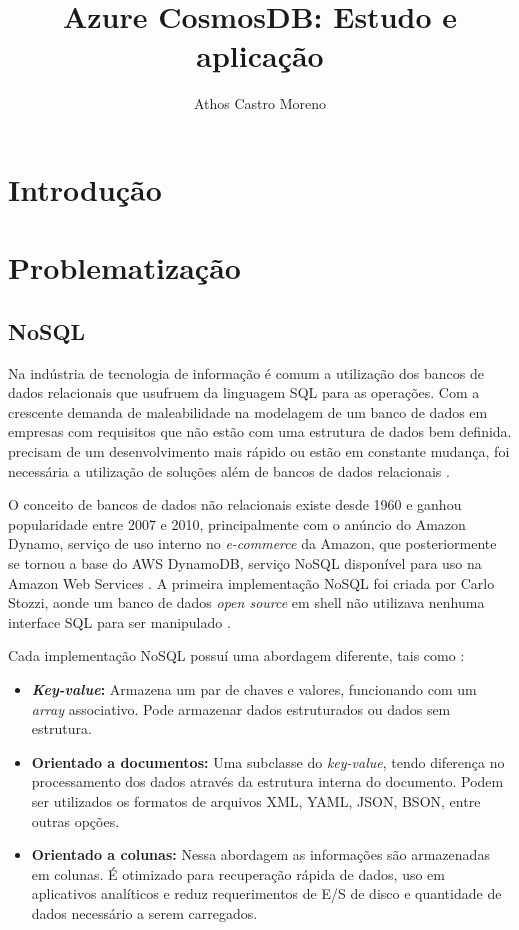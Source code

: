 \documentclass[12pt]{article}
\title{Azure CosmosDB: Estudo e aplicação}
\author{Athos Castro Moreno}
\begin{document}
 

\maketitle

\begin{resumo} 
\end{resumo}

\section{Introdução}

\section{Problematização} 

\subsection{NoSQL}
Na indústria de tecnologia de informação é comum a utilização dos bancos de dados relacionais que usufruem da linguagem SQL para as operações. Com a crescente demanda
de maleabilidade na modelagem de um banco de dados em empresas com requisitos que não estão com uma estrutura de dados bem definida. precisam de um desenvolvimento mais rápido
ou estão em constante mudança, foi necessária a utilização de soluções além de bancos de dados relacionais \cite{Oliveira2011}.

O conceito de bancos de dados não relacionais existe desde 1960 e ganhou popularidade entre 2007 e 2010, principalmente com o anúncio do Amazon Dynamo, serviço de uso interno no \textit{e-commerce}
da Amazon, que posteriormente se tornou a base do AWS DynamoDB, serviço NoSQL disponível para uso na Amazon Web Services \cite{DeCandia2007}.
A primeira implementação NoSQL foi criada por Carlo Stozzi, aonde um banco de dados \textit{open source} em shell não utilizava nenhuma interface SQL para ser manipulado \cite{Lith2010}. 

Cada implementação NoSQL possuí uma abordagem diferente, tais como \cite{Lith2010} \cite{Leavitt2010}:

\begin{itemize}
	\item \textbf{\textit{Key-value}:} Armazena um par de chaves e valores, funcionando com um \textit{array} associativo. Pode armazenar dados estruturados ou dados sem estrutura.
	\item \textbf{Orientado a documentos:} Uma subclasse do \textit{key-value}, tendo diferença no processamento dos dados através da estrutura interna do documento. Podem ser utilizados 
	os formatos de arquivos XML, YAML, JSON, BSON, entre outras opções.
	\item \textbf{Orientado a colunas:} Nessa abordagem as informações são armazenadas em colunas. É otimizado para recuperação rápida de dados, uso em aplicativos 
	analíticos e reduz requerimentos de E/S de disco e quantidade de dados necessário a serem carregados.
\end{itemize}
\end{document}
